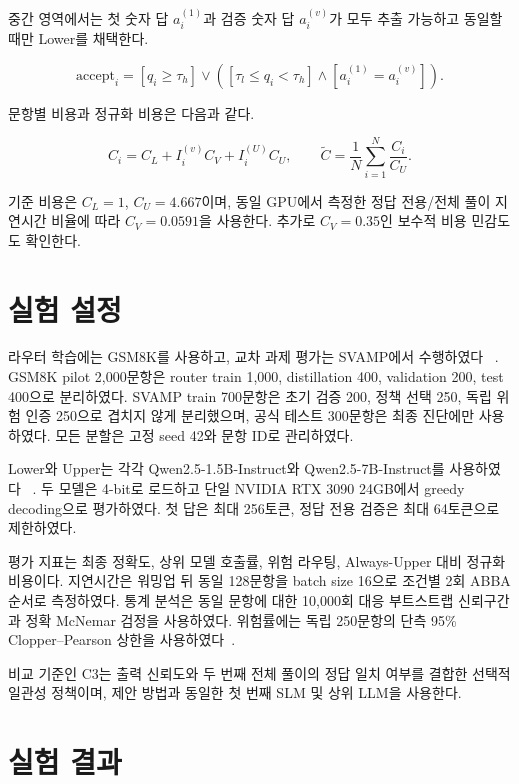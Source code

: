 \documentclass[preprint]{kcc}
\begin{document}
중간 영역에서는 첫 숫자 답 $a_i^{(1)}$과 검증 숫자 답 $a_i^{(v)}$가 모두 추출
가능하고 동일할 때만 Lower를 채택한다.

\begin{equation}
\text{accept}_i = [q_i\ge\tau_h]\lor
([\tau_l\le q_i<\tau_h]\land[a_i^{(1)}=a_i^{(v)}]).
\end{equation}

문항별 비용과 정규화 비용은 다음과 같다.

\begin{equation}
C_i=C_L+I_i^{(v)}C_V+I_i^{(U)}C_U, \qquad
\widetilde{C}=\frac{1}{N}\sum_{i=1}^{N}\frac{C_i}{C_U}.
\end{equation}

기준 비용은 $C_L=1$, $C_U=4.667$이며, 동일 GPU에서 측정한 정답 전용/전체 풀이
지연시간 비율에 따라 $C_V=0.0591$을 사용한다. 추가로 $C_V=0.35$인 보수적 비용
민감도도 확인한다.

\section{실험 설정}

라우터 학습에는 GSM8K를 사용하고, 교차 과제 평가는 SVAMP에서 수행하였다
~\cite{cobbe2021gsm8k,patel2021svamp}. GSM8K pilot 2,000문항은 router train 1,000,
distillation 400, validation 200, test 400으로 분리하였다. SVAMP train 700문항은
초기 검증 200, 정책 선택 250, 독립 위험 인증 250으로 겹치지 않게
분리했으며, 공식 테스트 300문항은 최종 진단에만 사용하였다. 모든 분할은 고정 seed
42와 문항 ID로 관리하였다.

Lower와 Upper는 각각 Qwen2.5-1.5B-Instruct와 Qwen2.5-7B-Instruct를 사용하였다
~\cite{yang2024qwen25}. 두 모델은 4-bit로 로드하고 단일 NVIDIA RTX 3090 24GB에서
greedy decoding으로 평가하였다. 첫 답은 최대 256토큰, 정답 전용 검증은 최대
64토큰으로 제한하였다.

평가 지표는 최종 정확도, 상위 모델 호출률, 위험 라우팅, Always-Upper 대비
정규화 비용이다. 지연시간은 워밍업 뒤 동일 128문항을 batch size 16으로 조건별
2회 ABBA 순서로 측정하였다. 통계 분석은 동일 문항에 대한 10,000회 대응 부트스트랩
신뢰구간과 정확 McNemar 검정을 사용하였다. 위험률에는 독립 250문항의 단측
95\% Clopper--Pearson 상한을 사용하였다~\cite{clopper1934use}.

비교 기준인 C3는 출력 신뢰도와 두 번째 전체 풀이의 정답 일치 여부를 결합한
선택적 일관성 정책이며, 제안 방법과 동일한 첫 번째 SLM 및 상위 LLM을 사용한다.

\section{실험 결과}
\end{document}
